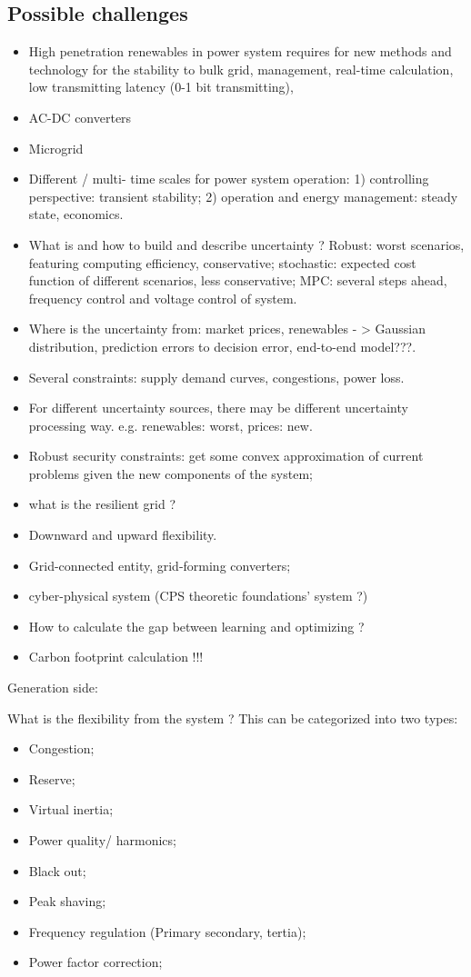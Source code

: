 \documentclass{article}
\begin{document}
\subsection{Possible challenges}
\begin{itemize}
  \item High penetration renewables in power system requires for new methods and technology for the stability to bulk grid, management, real-time calculation, low transmitting latency (0-1 bit transmitting),  
  \item AC-DC converters
  \item Microgrid
  \item Different / multi- time scales for power system operation: 1) controlling perspective: transient stability; 2) operation and energy management: steady state, economics.
  \item What is and how to build and describe uncertainty ? Robust: worst scenarios, featuring computing efficiency, conservative; stochastic: expected cost function of different scenarios, less conservative; MPC: several steps ahead, frequency control and voltage control of system. 
  \item Where is the uncertainty from: market prices, renewables - > Gaussian distribution, prediction errors to decision error, end-to-end model???.
  \item Several constraints: supply demand curves, congestions, power loss.
  \item For different uncertainty sources, there may be different uncertainty processing way. e.g. renewables: worst, prices: new.
  \item Robust security constraints: get some convex approximation of current problems given the new components of the system;
  \item what is the resilient grid ?
  \item Downward and upward flexibility. 
  \item Grid-connected entity, grid-forming converters;
  \item cyber-physical system (CPS theoretic foundations' system ?)
  \item How to calculate the gap between learning and optimizing ?
  \item Carbon footprint calculation !!!
\end{itemize}

Generation side:

What is the flexibility from the system ? This can be categorized into two types:
\begin{itemize}
  \item Congestion;
  \item Reserve;
  \item Virtual inertia;
  \item Power quality/ harmonics;
  \item Black out;
  \item Peak shaving;
  \item Frequency regulation (Primary secondary, tertia);  
  \item Power factor correction; 
\end{itemize}
\end{document}
